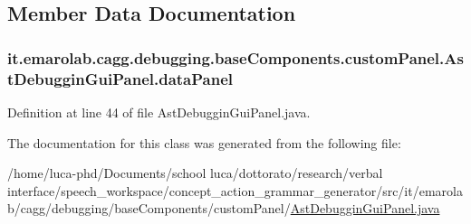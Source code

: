 \subsection{Member Data Documentation}
\hypertarget{classit_1_1emarolab_1_1cagg_1_1debugging_1_1baseComponents_1_1customPanel_1_1AstDebugginGuiPanel_a2b156424a1e54aa5e4ec158ba476166f}{
\subsubsection[{data\-Panel}]{ it.\-emarolab.\-cagg.\-debugging.\-base\-Components.\-custom\-Panel.\-Ast\-Debuggin\-Gui\-Panel.\-data\-Panel\hspace{0.3cm}{\ttfamily [private]}}}\label{classit_1_1emarolab_1_1cagg_1_1debugging_1_1baseComponents_1_1customPanel_1_1AstDebugginGuiPanel_a2b156424a1e54aa5e4ec158ba476166f}


Definition at line 44 of file Ast\-Debuggin\-Gui\-Panel.\-java.



The documentation for this class was generated from the following file\-:\begin{DoxyCompactItemize}
\item 
/home/luca-\/phd/\-Documents/school luca/dottorato/research/verbal interface/speech\-\_\-workspace/concept\-\_\-action\-\_\-grammar\-\_\-generator/src/it/emarolab/cagg/debugging/base\-Components/custom\-Panel/\hyperlink{AstDebugginGuiPanel_8java}{Ast\-Debuggin\-Gui\-Panel.\-java}\end{DoxyCompactItemize}
